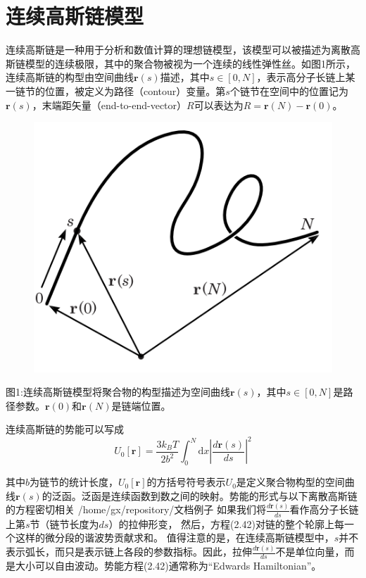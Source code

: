 \documentclass{article}
\begin{document}
\title{}
\maketitle
\section{连续高斯链模型}
连续高斯链是一种用于分析和数值计算的理想链模型，该模型可以被描述为离散高斯链模型的连续极限，其中的聚合物被视为一个连续的线性弹性丝。如图1所示，连续高斯链的构型由空间曲线$\mathbf{r}(s)$描述，其中$s\in [0,N]$，表示高分子长链上某一链节的位置，被定义为路径（contour）变量。第$s$个链节在空间中的位置记为$\mathbf{r}(s)$，末端距矢量（end-to-end-vector）$R$可以表达为$R=\mathbf{r}(N)−\mathbf{r}(0)$。

\begin{figure}[H]
\centering
\includegraphics[scale=0.7]{./figures/1.png}
\caption{}
\end{figure}

图1:连续高斯链模型将聚合物的构型描述为空间曲线$\mathbf{r}(s)$，其中$s\in [0,N]$是路径参数。$\mathbf{r}(0)$和$\mathbf{r}(N)$是链端位置。

连续高斯链的势能可以写成
$$U_0[\mathbf{r}]=\frac{3k_BT}{2b^2}\int_{0}^{N} \mathrm{d}x\left| \frac{d\mathbf{r}(s)}{ds} \right|^2$$

其中$b$为链节的统计长度，$U_0[\mathbf{r}]$的方括号符号表示$U_0$是定义聚合物构型的空间曲线$\mathbf{r}(s)$的泛函。泛函是连续函数到数之间的映射。势能的形式与以下离散高斯链的方程密切相关
/home/gx/repository/文档例子
如果我们将$\frac{d\mathbf{r}(s)}{ds}$看作高分子长链上第$s$节（链节长度为$ds$）的拉伸形变，
然后，方程(2.42)对链的整个轮廓上每一个这样的微分段的谐波势贡献求和。
值得注意的是，在连续高斯链模型中，$s$并不表示弧长，而只是表示链上各段的参数指标。因此，拉伸$\frac{d\mathbf{r}(s)}{ds}$不是单位向量，而是大小可以自由波动。势能方程(2.42)通常称为“Edwards Hamiltonian”。
\end{document}
